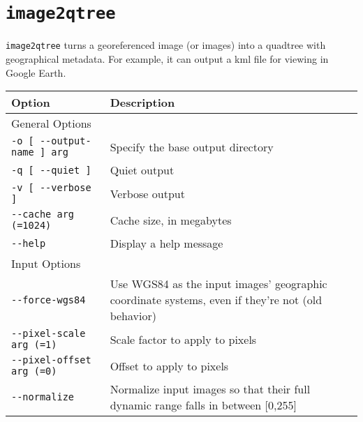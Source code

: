 \section{{\tt image2qtree}}\label{sec:image2qtree}

\verb#image2qtree# turns a georeferenced image (or images) into a quadtree with geographical metadata.  For example, it can output a kml file for viewing in Google Earth.

\begin{table}
\begin{tabular}{|l|l|} \hline
Option & Description \\ \hline \hline
General Options \\ \hline
\verb#-o [ --output-name ] arg# & Specify the base output directory\\ \hline
\verb#-q [ --quiet ]# & Quiet output\\ \hline
\verb#-v [ --verbose ]# & Verbose output\\ \hline
\verb#--cache arg (=1024)# & Cache size, in megabytes\\ \hline
\verb#--help# & Display a help message\\ \hline

Input Options\\ \hline
\verb#--force-wgs84# & Use WGS84 as the input images' geographic coordinate systems, even if they're not (old behavior)\\ \hline
\verb#--pixel-scale arg (=1)# & Scale factor to apply to pixels\\ \hline
\verb#--pixel-offset arg (=0)# & Offset to apply to pixels\\ \hline
\verb#--normalize# & Normalize input images so that their full dynamic range falls in between [0,255]\\ \hline


\end{tabular}
\end{table}
